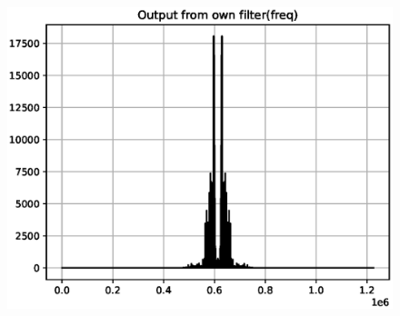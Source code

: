 \documentclass[journal,12pt,twocolumn]{IEEEtran}
\begin{document}
\begin{figure}[!ht]
\centering
\includegraphics[width=1\columnwidth,height=0.8\columnwidth]{./figs/ee18btech11030_3.eps}
\caption{}
\label{fig:ee18btech11030_3}
\end{figure}
\end{document}
